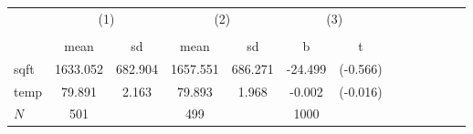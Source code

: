 {
\def\sym#1{\ifmmode^{#1}\else\(^{#1}\)\fi}
\begin{tabular}{l*{3}{cccc}}
\hline\hline
            &\multicolumn{2}{c}{(1)}  &\multicolumn{2}{c}{(2)}  &\multicolumn{2}{c}{(3)}           \\
            &\multicolumn{2}{c}{}     &\multicolumn{2}{c}{}     &\multicolumn{2}{c}{}              \\
            &        mean&          sd&        mean&          sd&           b         &           t\\
\hline
sqft        &    1633.052&     682.904&    1657.551&     686.271&     -24.499         &    (-0.566)\\
temp        &      79.891&       2.163&      79.893&       1.968&      -0.002         &    (-0.016)\\
\hline
\(N\)       &         501&            &         499&            &        1000         &            \\
\hline\hline
\end{tabular}
}
